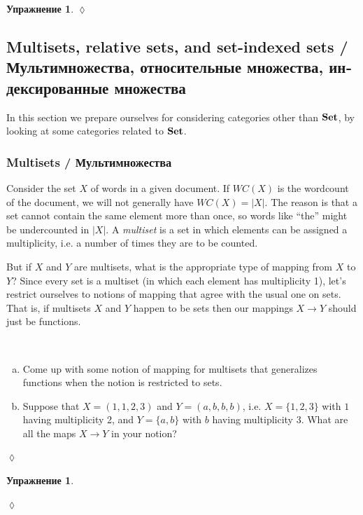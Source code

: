 \documentclass[a4paper]{book}
\def\to{\rightarrow}
\def\Set{{\bf Set}}
\theoremstyle{myth}
\newtheorem{excENG}[envENG]{\begin{english}Exercise\end{english}}
\newenvironment{exerciseENG}{\begin{excENG}}{\hspace*{\fill}$\lozenge$\end{excENG}}
\newtheorem{excRUS}[envRUS]{Упражнение}
\newenvironment{exerciseRUS}{\begin{excRUS}}{\hspace*{\fill}$\lozenge$\end{excRUS}}
\def\sexc{\begin{enumerate}[a.)]\setlength{\itemsep}{.1cm}\setlength{\parskip}{.1cm}\item}
\def\next{\item}
\def\endsexc{\end{enumerate}}
\begin{document}
\begin{russian}
\begin{exerciseRUS}
 
\end{exerciseRUS}


\subsection{Multisets, relative sets, and set-indexed sets / Мультимножества, относительные множества, индексированные множества}

In this section we prepare ourselves for considering categories other than $\Set$, by looking at some categories related to $\Set$. 

 


\subsubsection{Multisets / Мультимножества}

Consider the set $X$ of words in a given document. If $WC(X)$ is the wordcount of the document, we will not generally have $WC(X)=|X|$. The reason is that a set cannot contain the same element more than once, so words like “the” might be undercounted in $|X|$. A {\em multiset} is a set in which elements can be assigned a multiplicity, i.e. a number of times they are to be counted. 

 

But if $X$ and $Y$ are multisets, what is the appropriate type of mapping from $X$ to $Y$? Since every set is a multiset (in which each element has multiplicity 1), let's restrict ourselves to notions of mapping that agree with the usual one on sets. That is, if multisets $X$ and $Y$ happen to be sets then our mappings $X\to Y$ should just be functions.

 

\begin{exerciseENG}\label{exc:multiset 1}~
\sexc Come up with some notion of mapping for multisets that generalizes functions when the notion is restricted to sets. 
\next Suppose that $X=(1,1,2,3)$ and $Y=(a,b,b,b)$, i.e. $X=\{1,2,3\}$ with $1$ having multiplicity 2, and $Y=\{a,b\}$ with $b$ having multiplicity 3. What are all the maps $X\to Y$ in your notion?
\endsexc
\end{exerciseENG}

\begin{exerciseRUS}\label{exc:multiset 1}~
 

\end{exerciseRUS}
\end{russian}
\end{document}
